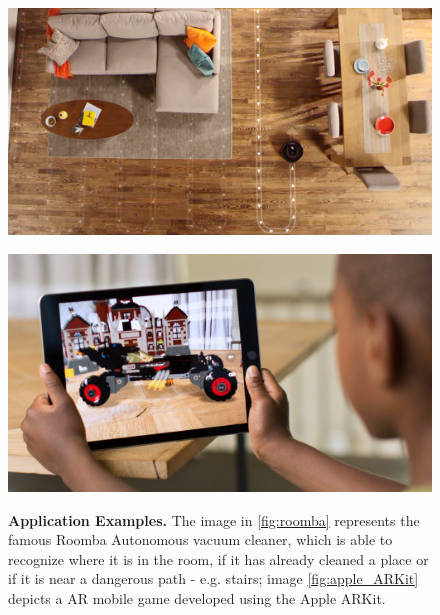 \begin{figure}[!hbt]
    \centering
    \begin{minipage}[t!]{0.4\textwidth}
        \centering
        \includegraphics[width=\textwidth]{figures/00_intro/roomba_cleaning.jpg}
        \label{fig:roomba}
    \end{minipage} \hspace{10px}
    \begin{minipage}[t!]{0.4\textwidth}
        \centering
        \includegraphics[width=\textwidth]{figures/00_intro/apple_ARKit.jpg}
        \label{fig:apple_ARKit}
    \end{minipage}%
    
    \caption{\textbf{Application Examples.} The image in \ref{fig:roomba} represents the famous Roomba Autonomous vacuum cleaner, which is able to recognize where it is in the room, if it has already cleaned a place or if it is near a dangerous path - e.g. stairs; image \ref{fig:apple_ARKit} depicts a AR mobile game developed using the Apple ARKit.} 
    \label{fig:applications}
\end{figure}


